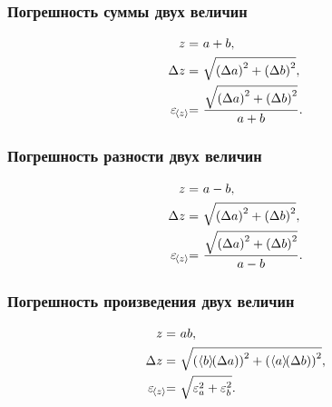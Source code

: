 \documentclass[a4paper, 12pt]{extarticle}
\newcommand{\eps}{\epsilon}
\begin{document}
\subsubsection{Погрешность суммы двух величин}
\vspace{-0.75cm} %
\begin{align} \label{eq:sum-error}
\begin{split}
z = & \ a + b, \\
\Delta z = &\   \sqrt{\left(\Delta a\right)^2 + \left( \Delta b\right)^2}, \\
 \eps_{\hspace{1.75pt}\MTDMean{z}} =&\  \frac{\sqrt{\left(\Delta a\right)^2 + \left( \Delta b\right)^2}}{a + b}.
 \end{split}
\end{align}
\subsubsection{Погрешность разности двух величин}
\vspace{-0.75cm}
\begin{align} \label{eq:sub-error}
\begin{split}
z = & \ a - b, \\
\Delta z = &\   \sqrt{\left(\Delta a\right)^2 + \left( \Delta b\right)^2}, \\
 \eps_{\hspace{1.75pt}\MTDMean{z}} =&\  \frac{\sqrt{\left(\Delta a\right)^2 + \left( \Delta b\right)^2}}{a - b}.
\end{split}
\end{align}

\subsubsection{Погрешность произведения двух величин}
\vspace{-0.75cm}
\begin{align} \label{eq:mul-error}
\begin{split}
z = &\ ab, \\
\Delta z = &\   \sqrt{\left(\ \MTDMean{b}\left(\Delta a\right)\right)^2 + \left(\ \MTDMean{a}\left(\Delta b\right)\right)^2}, \\
 \eps_{\hspace{1.75pt}\MTDMean{z}} =&\ \sqrt{\eps_a^2 + \eps_b^2}.
 \end{split}
\end{align}
\end{document}
